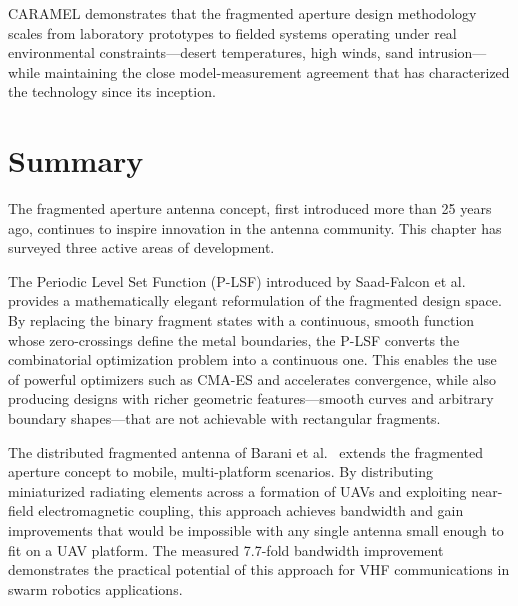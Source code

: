 CARAMEL demonstrates that the fragmented aperture design methodology scales from laboratory prototypes to fielded systems operating under real environmental constraints---desert temperatures, high winds, sand intrusion---while maintaining the close model-measurement agreement that has characterized the technology since its inception.

\section{Summary}

The fragmented aperture antenna concept, first introduced more than 25 years ago, continues to inspire innovation in the antenna community.  This chapter has surveyed three active areas of development.

The Periodic Level Set Function (P-LSF) introduced by Saad-Falcon et al.\ \cite{SaadFalcon2024LevelSet} provides a mathematically elegant reformulation of the fragmented design space.  By replacing the binary fragment states with a continuous, smooth function whose zero-crossings define the metal boundaries, the P-LSF converts the combinatorial optimization problem into a continuous one.  This enables the use of powerful optimizers such as CMA-ES and accelerates convergence, while also producing designs with richer geometric features---smooth curves and arbitrary boundary shapes---that are not achievable with rectangular fragments.

The distributed fragmented antenna of Barani et al.\ \cite{Barani2018Fragmented} extends the fragmented aperture concept to mobile, multi-platform scenarios.  By distributing miniaturized radiating elements across a formation of UAVs and exploiting near-field electromagnetic coupling, this approach achieves bandwidth and gain improvements that would be impossible with any single antenna small enough to fit on a UAV platform.  The measured 7.7-fold bandwidth improvement demonstrates the practical potential of this approach for VHF communications in swarm robotics applications.


